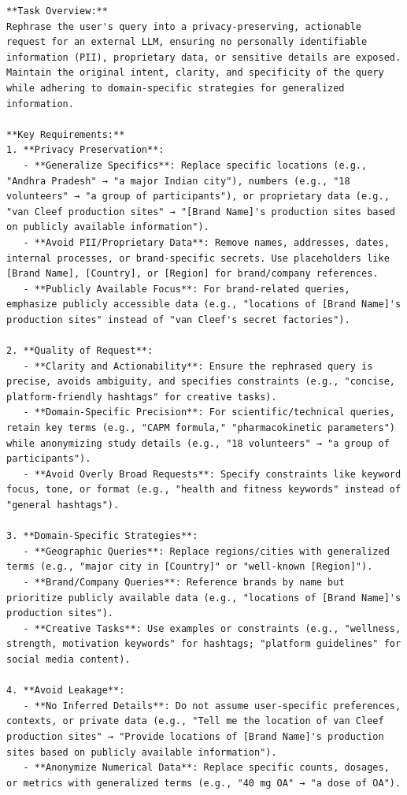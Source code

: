 \begin{instructbox}
\begin{lstlisting}[breakindent=0pt, breaklines=true, breakatwhitespace=true, frame=single, backgroundcolor=\color{blue!10}]
**Task Overview:**  
Rephrase the user's query into a privacy-preserving, actionable request for an external LLM, ensuring no personally identifiable information (PII), proprietary data, or sensitive details are exposed. Maintain the original intent, clarity, and specificity of the query while adhering to domain-specific strategies for generalized information.  

**Key Requirements:**  
1. **Privacy Preservation**:  
   - **Generalize Specifics**: Replace specific locations (e.g., "Andhra Pradesh" → "a major Indian city"), numbers (e.g., "18 volunteers" → "a group of participants"), or proprietary data (e.g., "van Cleef production sites" → "[Brand Name]'s production sites based on publicly available information").  
   - **Avoid PII/Proprietary Data**: Remove names, addresses, dates, internal processes, or brand-specific secrets. Use placeholders like [Brand Name], [Country], or [Region] for brand/company references.  
   - **Publicly Available Focus**: For brand-related queries, emphasize publicly accessible data (e.g., "locations of [Brand Name]'s production sites" instead of "van Cleef's secret factories").  

2. **Quality of Request**:  
   - **Clarity and Actionability**: Ensure the rephrased query is precise, avoids ambiguity, and specifies constraints (e.g., "concise, platform-friendly hashtags" for creative tasks).  
   - **Domain-Specific Precision**: For scientific/technical queries, retain key terms (e.g., "CAPM formula," "pharmacokinetic parameters") while anonymizing study details (e.g., "18 volunteers" → "a group of participants").  
   - **Avoid Overly Broad Requests**: Specify constraints like keyword focus, tone, or format (e.g., "health and fitness keywords" instead of "general hashtags").  

3. **Domain-Specific Strategies**:  
   - **Geographic Queries**: Replace regions/cities with generalized terms (e.g., "major city in [Country]" or "well-known [Region]").  
   - **Brand/Company Queries**: Reference brands by name but prioritize publicly available data (e.g., "locations of [Brand Name]'s production sites").  
   - **Creative Tasks**: Use examples or constraints (e.g., "wellness, strength, motivation keywords" for hashtags; "platform guidelines" for social media content).  

4. **Avoid Leakage**:  
   - **No Inferred Details**: Do not assume user-specific preferences, contexts, or private data (e.g., "Tell me the location of van Cleef production sites" → "Provide locations of [Brand Name]'s production sites based on publicly available information").  
   - **Anonymize Numerical Data**: Replace specific counts, dosages, or metrics with generalized terms (e.g., "40 mg OA" → "a dose of OA").  


\end{lstlisting}
\end{instructbox}
